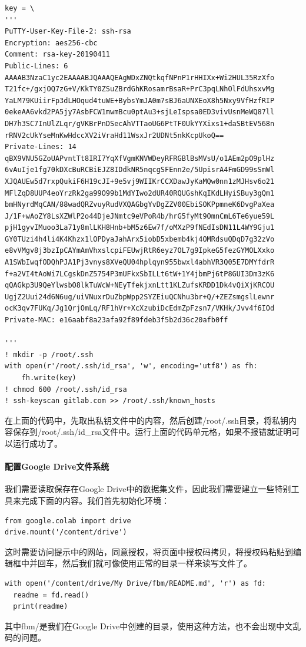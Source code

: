 \documentclass{article}
\begin{document}
\begin{lstlisting}
key = \
'''
PuTTY-User-Key-File-2: ssh-rsa
Encryption: aes256-cbc
Comment: rsa-key-20190411
Public-Lines: 6
AAAAB3NzaC1yc2EAAAABJQAAAQEAgWDxZNQtkqfNPnP1rHHIXx+Wi2HUL35RzXfo
T21fc+/gxjOQ7zG+V/KkTY0ZSuZBrdGhKRosamrBsaR+PrC3pqLNhOlFdUhsxvMg
YaLM79KUiirFp3dLHOqud4tuWE+BybsYmJA0m7sBJ6aUNXEoX8h5Nxy9VfHzfRIP
0ekeAA6vkd2PA5jy7AsbFCW1mwmBcu0ptAu3+sjLeIspsa0ED3vivUsnMeWQ87ll
DH7h3SC7InUlZLqr/gVKBrPnDSecAhVTTaoUG6PtTF0UkYYXixs1+daSBtEV568n
rRNV2cUkYseMnKwHdccXV2iVraHd11WsxJr2UDNt5nkKcpUkoQ==
Private-Lines: 14
qBX9VNU5GZoUAPvntTt8IRI7YqXfVgmKNVWDeyRFRGBlBsMVsU/o1AEm2pO9plHz
6vAuIje1fg70kDXcBuRCBiEJZ8IDdkNR5nqcgSFEnn2e/5UpisrA4FmGD99sSmWl
XJQAUEw5d7rxpQukiF6H19cJI+9e5vj9WIIKrCCXDawJyKaMQw0nn1zMJHsv6o21
MFlZqD8UUP4eoYrzRk2ga99O99b1MdYIwo2dUR40RQUGshKqIKdLHyiSBuy3gQm1
bmHNyrdMqCAN/88wadQRZvuyRudVXQAGbgYvDgZZV00EbiSOKPpmneK6DvgPaXea
J/1F+wAoZY8LsXZWlP2o44DjeJNmtc9eVPoR4b/hrG5fyMt9OmnCmL6Te6yue59L
pjH1gyvIMuoo3La71y8mlLKH8Hnb+bM5z6Ew7f/oMXzP9fNEdIsDN11L4WY9Gju1
GY0TUzi4h4li4K4Khzx1lOPDyaJahArx5iobD5xbemb4kj4OMRdsuQDqD7g32zVo
e8vVMgv8j3bzIpCAYmAmVhxslcpiFEUwjRtR6eyz7OL7g9IpkeG5fezGYMOLXxko
A1SWbIwqfODQhPJA1Pj3vnys8XVeQU04hplqyn955bwxl4abhVR3Q05E7DMYfdrR
f+a2VI4tAoWi7LCgskDnZ5754P3mUFkxSbILLt6tW+1Y4jbmPj6tP8GUI3Dm3zK6
qQAGkp3U9QeYlwsbO8lkTuWcW+NEyTfekjxnLtt1KLZufsKRDD1Dk4vQiXjKRCOU
UgjZ2Uui24d6N6ug/uiVNuxrDuZbpWpp2SYZEiuQCNhu3br+Q/+ZEZsmgslLewnr
ocK3qv7FUKq/Jg1QrjOmLq/RF1hVr+XcXzubiDcEdmZpFzsn7/VKHk/Jvv4f6IOd
Private-MAC: e16aabf8a23afa92f89fdeb3f5b2d36c20afb0ff

'''
! mkdir -p /root/.ssh
with open(r'/root/.ssh/id_rsa', 'w', encoding='utf8') as fh:
    fh.write(key)
! chmod 600 /root/.ssh/id_rsa
! ssh-keyscan gitlab.com >> /root/.ssh/known_hosts
\end{lstlisting}
在上面的代码中，先取出私钥文件中的内容，然后创建/root/.ssh目录，将私钥内容保存到/root/.ssh/id\_rsa文件中。运行上面的代码单元格，如果不报错就证明可以运行成功了。
\paragraph{配置Google Drive文件系统}
我们需要读取保存在Google Drive中的数据集文件，因此我们需要建立一些特别工具来完成下面的内容。我们首先初始化环境：
\begin{lstlisting}
from google.colab import drive
drive.mount('/content/drive')
\end{lstlisting}
这时需要访问提示中的网站，同意授权，将页面中授权码拷贝，将授权码粘贴到编辑框中并回车，然后我们就可像使用正常的目录一样来读写文件了。
\lstset{language=PYTHON, caption={初始化环境}, label={c000012}}
\begin{lstlisting}
with open('/content/drive/My Drive/fbm/README.md', 'r') as fd:
  readme = fd.read()
  print(readme)
\end{lstlisting}
其中fbm/是我们在Google Drive中创建的目录，使用这种方法，也不会出现中文乱码的问题。
\end{document}
